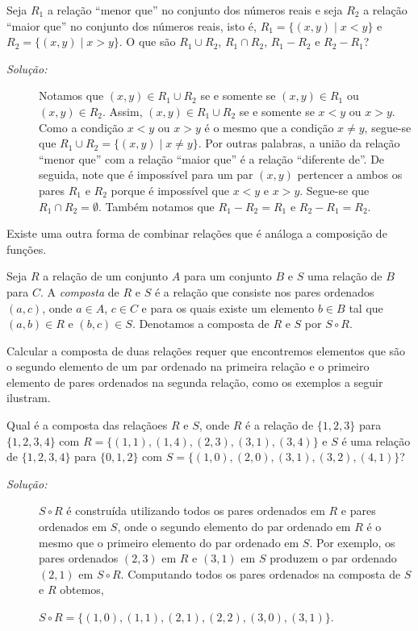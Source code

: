 \label{exem410}
\begin{exmp}
Seja $R_1$ a relação ``menor que'' no conjunto dos números reais e seja $R_2$ a
relação ``maior que'' no conjunto dos números reais, isto é, $R_1 = \{(x,y)
\mid x < y\}$ e $R_2 = \{(x,y) \mid x > y\}$. O que são $R_1 \cup R_2$, $R_1
\cap R_2$, $R_1 - R_2$ e $R_2 - R_1$?

\begin{description}
\item[\emph{Solução:}]Notamos que $(x,y) \in R_1 \cup R_2$ se e somente se
$(x,y) \in R_1$ ou $(x,y) \in R_2$. Assim, $(x,y) \in R_1 \cup R_2$ se e somente
se $x < y$ ou $x > y$. Como a condição $x < y$ ou $x > y$ é o mesmo que a
condição $x \neq y$, segue-se que $R_1 \cup R_2 = \{(x,y) \mid x \neq y\}$. Por
outras palabras, a união da relação ``menor que'' com a relação ``maior que'' é
a relação ``diferente de''.
De seguida, note que é impossível para um par $(x,y)$ pertencer a ambos os pares
$R_1$ e $R_2$ porque é impossível que $x<y$ e $x>y$. Segue-se que $R_1 \cap R_2
= \emptyset$. Também notamos que $R_1 - R_2 = R_1$ e $R_2 - R_1 = R_2$.
\end{description}
\end{exmp}

Existe uma outra forma de combinar relações que é análoga a composição de
funções.

\label{def46}
\begin{defn}
Seja $R$ a relação de um conjunto $A$ para um conjunto $B$ e $S$ uma relação de
$B$ para $C$. A \emph{composta} de $R$ e $S$ é a relação que consiste nos pares
ordenados $(a,c)$, onde $a \in A$, $c \in C$ e para os quais existe um elemento
$b \in B$ tal que $(a,b) \in R$ e $(b,c) \in S$. Denotamos a composta de $R$ e
$S$ por $S \circ R$.
\end{defn}

Calcular a composta de duas relações requer que encontremos elementos que são o
segundo elemento de um par ordenado na primeira relação e o primeiro elemento de
pares ordenados na segunda relação, como os exemplos a seguir ilustram.

\label{exem411}
\begin{exmp}
Qual é a composta das relaçãoes $R$ e $S$, onde $R$ é a relação de $\{1,2,3\}$
para $\{1,2,3,4\}$ com $R = \{(1,1),(1,4),(2,3),(3,1),(3,4)\}$ e $S$ é uma
relação de $\{1,2,3,4\}$ para $\{0,1,2\}$ com $S =
\{(1,0),(2,0),(3,1),(3,2),(4,1)\}$?

\begin{description}
\item[\emph{Solução:}] $S \circ R$ é construída utilizando todos os pares
ordenados em $R$ e pares ordenados em $S$, onde o segundo elemento do par
ordenado em $R$ é o mesmo que o primeiro elemento do par ordenado em $S$. Por
exemplo, os pares ordenados $(2,3)$ em $R$ e $(3,1)$ em $S$ produzem o par
ordenado $(2,1)$ em $S \circ R$. Computando todos os pares ordenados na composta
de $S$ e $R$ obtemos,
\begin{center}
$S \circ R = \{(1,0), (1,1), (2,1), (2,2), (3,0), (3,1)\}$.
\end{center}
\end{description}
\end{exmp}


